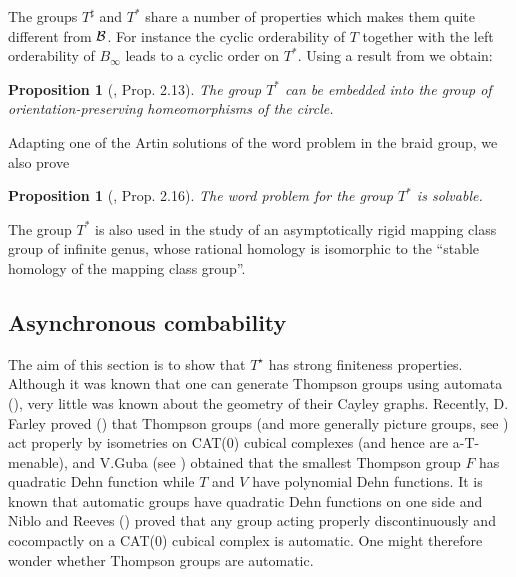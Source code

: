 \documentclass[twoside]{irmaems}
\theoremstyle{plain}
\newtheorem{proposition}[theorem]{Proposition}
\theoremstyle{definition}
\theoremstyle{remark}
\newcommand{\B}{{{\cal B}}}
\begin{document}
\vspace{0.1cm}\noindent  
The groups $T^{\sharp}$ and $T^*$ share a number of properties 
which makes them  quite different from $\B$.  
For instance the cyclic orderability of $T$ together with the 
left orderability of $B_{\infty}$ leads to a  cyclic order on $T^*$. 
Using a result from \cite{ca} we obtain: 

 
 \begin{proposition}[\cite{fu-ka2}, Prop. 2.13]
  The group $T^*$ can be embedded into the group of orientation-preserving homeomorphisms of the circle.
 \end{proposition}
 

\vspace{0.1cm}\noindent 
 Adapting one of the Artin  solutions of  
 the word problem in the braid group, we also prove 
 
 \begin{proposition}[\cite{fu-ka2}, Prop. 2.16]
 
 The word problem for the group  $T^*$ is solvable.
  \end{proposition}
  
 
 
 \vspace{0.1cm}\noindent 
The group  $T^*$ is also used in the study of an asymptotically rigid mapping class group of infinite genus, whose rational homology is isomorphic to the ``stable homology of the mapping class group''.



\subsection{Asynchronous combability}

\vspace{0.2cm}
\noindent 
The aim of this section is to show that $T^{\star}$ has strong finiteness 
properties. Although it was known  that one can generate 
Thompson groups  using automata (\cite{GN}), very little was known about the 
geometry of their Cayley graphs. Recently, D. Farley proved (\cite{Fa}) 
that Thompson groups (and more generally picture groups, see \cite{GuS}) 
act properly by isometries on CAT(0) 
cubical complexes  (and hence are a-T-menable), and V.Guba (see \cite{Gu,Gu2}) 
obtained that  
the smallest Thompson group $F$ has quadratic Dehn function while $T$ and $V$ 
have polynomial Dehn functions.  It is known that automatic groups have quadratic Dehn functions 
on one side and  Niblo and Reeves (\cite{NR}) proved that any group acting properly 
discontinuously and cocompactly on a CAT(0) cubical complex is automatic. 
One might  therefore wonder whether Thompson groups are automatic. 
\end{document}
